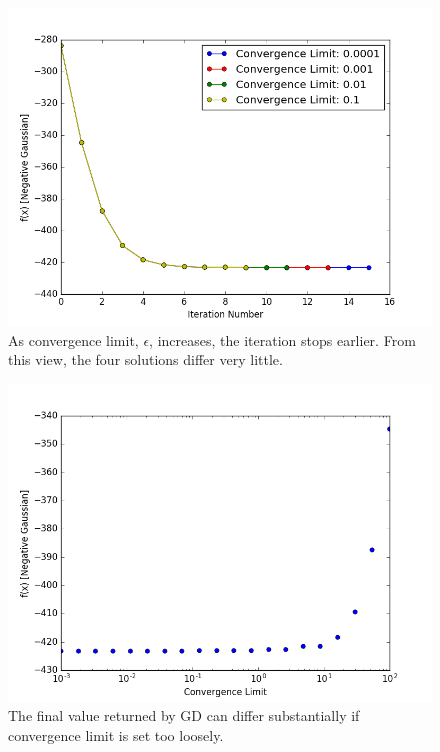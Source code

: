 \begin{figure}
	\centering
	\includegraphics [trim=0 0 0 0, clip, angle=0, width=0.8\columnwidth,
	keepaspectratio]{figures/1_1_convergence1}
	\caption{As convergence limit, $\epsilon$, increases, the iteration stops earlier. From this view, the four solutions differ very little.} 
	\label{fig:convergence1} 
\end{figure}

\begin{figure}
	\centering
	\includegraphics [trim=0 0 0 0, clip, angle=0, width=0.8\columnwidth,
	keepaspectratio]{figures/1_1_convergence}
	\caption{The final value returned by GD can differ substantially if convergence limit is set too loosely.} 
	\label{fig:convergence} 
\end{figure}

